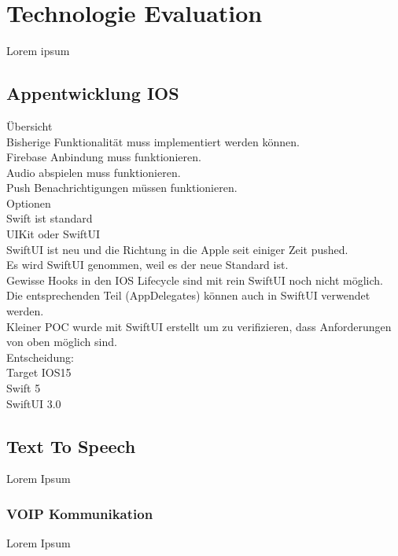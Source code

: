 \section{Technologie Evaluation}

Lorem ipsum

\subsection{Appentwicklung IOS}

Übersicht \\

Bisherige Funktionalität muss implementiert werden können. \\
Firebase Anbindung muss funktionieren. \\
Audio abspielen muss funktionieren. \\
Push Benachrichtigungen müssen funktionieren. \\

Optionen \\

Swift ist standard \\
UIKit oder SwiftUI \\

SwiftUI ist neu und die Richtung in die Apple seit einiger Zeit pushed. \\
Es wird SwiftUI genommen, weil es der neue Standard ist. \\
Gewisse Hooks in den IOS Lifecycle sind mit rein SwiftUI noch nicht möglich. \\
Die entsprechenden Teil (AppDelegates) können auch in SwiftUI verwendet werden. \\

Kleiner POC wurde mit SwiftUI erstellt um zu verifizieren, dass Anforderungen von oben möglich sind. \\

Entscheidung: \\

Target IOS15 \\
Swift 5 \\
SwiftUI 3.0 \\

\clearpage

\subsection{Text To Speech}

Lorem Ipsum

\subsubsection{VOIP Kommunikation}

Lorem Ipsum

\clearpage
